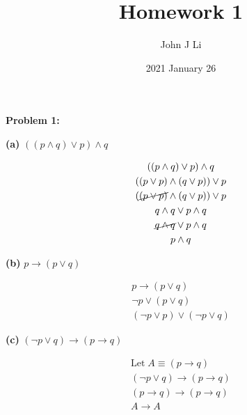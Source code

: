 \documentclass{article}
\title{Homework 1}
\date{2021 January 26}
\author{John J Li}
\begin{document}
    \maketitle
    \newpage

    \textbf{Problem 1:}

    \quad \textbf{(a)} $((p\land q)\lor p) \land q$

    \begin{gather*}
        ((p\land q)\lor p) \land q \\
        ((p \lor p) \land (q \lor p)) \lor p \\
        (\cancel{(p \lor p)} \land (q \lor p)) \lor p \\
        q\land q \lor p \land q \\
        \cancel{q\land q} \lor p \land q \\
        p \land q
    \end{gather*}


    \quad\textbf{(b)} $p\rightarrow (p\lor q)$

    \begin{gather*}
        p\rightarrow (p\lor q) \\
        \neg p \lor (p \lor q) \\
        (\neg p \lor p) \lor (\neg p \lor q)
    \end{gather*}


    \quad\textbf{(c)} $(\neg p \lor q) \rightarrow (p \rightarrow q)$

    \begin{gather*}
        \text{Let} \; A \equiv (p \rightarrow q) \\
        (\neg p \lor q) \rightarrow (p \rightarrow q) \\
        (p \rightarrow q) \rightarrow (p \rightarrow q) \\
        A \rightarrow A
    \end{gather*}

\end{document}
